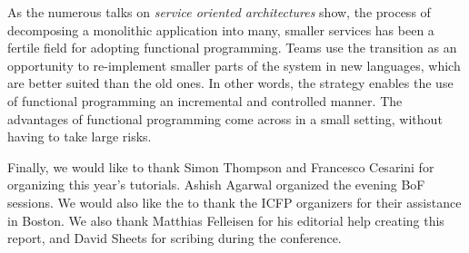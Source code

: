 \documentclass{jfp1}
\begin{document}
As the numerous talks on \textit{service oriented architectures} show, the
process of decomposing a monolithic application into many, smaller services
has been a fertile field for adopting functional programming. Teams use the
transition as an opportunity to re-implement smaller parts of the system in
new languages, which are better suited than the old ones. In other words,
the strategy enables the use of functional programming an incremental and
controlled manner. The advantages of functional programming come across in
a small setting, without having to take large risks.

Finally, we would like to thank Simon Thompson and Francesco Cesarini
for organizing this year's tutorials. Ashish Agarwal organized the
evening BoF sessions. We would also like the to thank the ICFP
organizers for their assistance in Boston. We also thank 
Matthias Felleisen for his editorial help creating this report, and
David Sheets for scribing during the conference.


\end{document}
